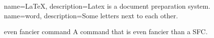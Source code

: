 \makeglossaries

{
      name=\LaTeX,
      description={Latex is a document preparation system.}
}
{
      name=word,
      description={Some letters next to each other.}
}




{even fancier command}
{A command that is even fancier than a \gls{SFC}.}

